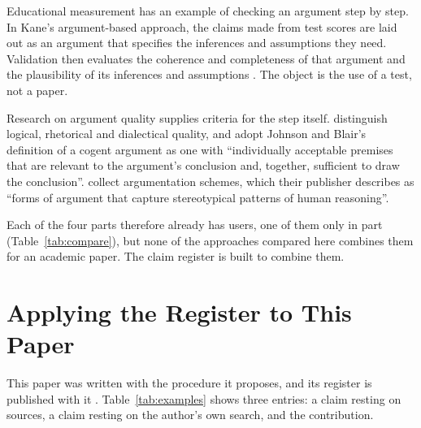 \documentclass[12pt, a4paper]{article}
\begin{document}
Educational measurement has an example of checking an
argument step by step.  In Kane's argument-based approach, the claims
made from test scores are laid out as an argument that specifies the
inferences and assumptions they need.  Validation then evaluates the coherence and completeness of that argument and the plausibility of
its inferences and assumptions \citep{kane2013}.  The object is the use
of a test, not a paper.

Research on argument quality supplies criteria for the step itself.
\citet{wachsmuth2017} distinguish logical, rhetorical and dialectical
quality, and adopt Johnson and Blair's definition of a cogent argument as one with ``individually
acceptable premises that are relevant to the argument's conclusion and,
together, sufficient to draw the conclusion''.  \citet{walton2008}
collect argumentation schemes, which their publisher describes as
``forms of argument that capture stereotypical patterns of human
reasoning''.

Each of the four parts therefore already has users, one of them only in part
(Table~\ref{tab:compare}), but none of the approaches compared here
combines them for an academic paper.  The claim register is built to combine them.

\section{Applying the Register to This Paper}
\label{sec:self}

This paper was written with the procedure it proposes, and its register is published with it \citep{veen2026repo}.  Table~\ref{tab:examples} shows three entries:
a claim resting on sources, a claim resting on the author's own search,
and the contribution.
\end{document}
